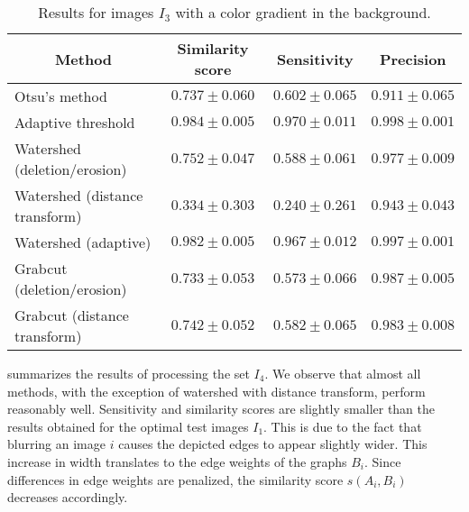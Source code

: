 		\begin{table}
			\centering
			\begin{tabular}{@{} l *3c @{}}
			\toprule
			\multicolumn{1}{c}{Method}    & Similarity score  & Sensitivity  & Precision \\ 
			\midrule
			Otsu's method                   & $0.737 \pm 0.060$ & $0.602 \pm 0.065$ & $0.911 \pm 0.065$ \\
			Adaptive threshold              & $0.984 \pm 0.005$ & $0.970 \pm 0.011$ & $0.998 \pm 0.001$ \\
			Watershed (deletion/erosion)    & $0.752 \pm 0.047$ & $0.588 \pm 0.061$ & $0.977 \pm 0.009$ \\
			Watershed (distance transform)  & $0.334 \pm 0.303$ & $0.240 \pm 0.261$ & $0.943 \pm 0.043$ \\
			Watershed (adaptive)            & $0.982 \pm 0.005$ & $0.967 \pm 0.012$ & $0.997 \pm 0.001$ \\
			Grabcut (deletion/erosion)      & $0.733 \pm 0.053$ & $0.573 \pm 0.066$ & $0.987 \pm 0.005$ \\
			Grabcut (distance transform)    & $0.742 \pm 0.052$ & $0.582 \pm 0.065$ & $0.983 \pm 0.008$ \\
			\bottomrule
			\end{tabular}
			\caption[\NEFIs evaluation - Images with background color gradient]{Results for images $I_3$ with a color gradient in the background.}
			\label{tab:background_gradient}
		\end{table}

		 summarizes the results of processing the set $I_4$. We observe that almost all methods, with the exception of watershed with distance transform, perform reasonably well. Sensitivity and similarity scores are slightly smaller than the results obtained for the optimal test images $I_1$. This is due to the fact that blurring an image $i$ causes the depicted edges to appear slightly wider. This increase in width translates to the edge weights of the graphs $B_i$. Since differences in edge weights are penalized, the similarity score $s(A_i,B_i)$ decreases accordingly.

